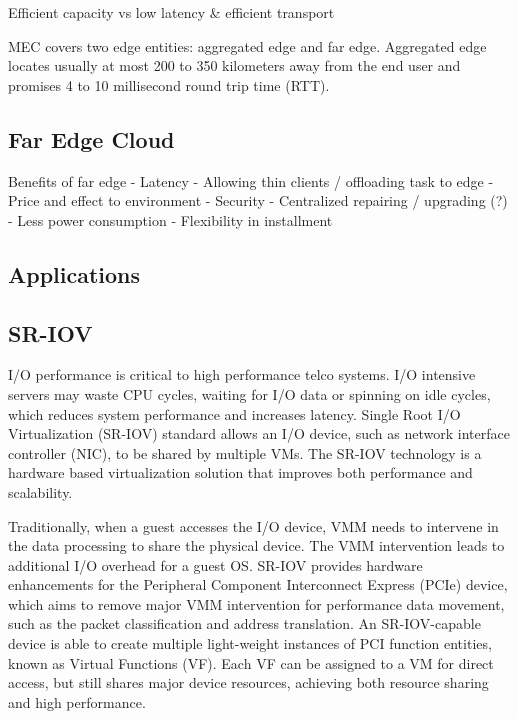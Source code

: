 Efficient capacity vs low latency \& efficient transport

MEC covers two edge entities: aggregated edge and far edge. Aggregated edge locates usually at most 200 to 350 kilometers away from the end user and promises 4 to 10 millisecond round trip time (RTT).

\subsection{Far Edge Cloud}

Benefits of far edge
    - Latency
    - Allowing thin clients / offloading task to edge
    - Price and effect to environment
    - Security
    - Centralized repairing / upgrading (?)
    - Less power consumption
    - Flexibility in installment
    



\subsection{Applications}


\subsection{SR-IOV}
\label{section:SR-IOV}

I/O performance is critical to high performance telco systems. I/O intensive servers may waste CPU cycles, waiting for I/O data or spinning on idle cycles, which reduces system performance and increases latency. Single Root I/O Virtualization (SR-IOV) standard allows an I/O device, such as network interface controller (NIC), to be shared by multiple VMs. The SR-IOV technology is a hardware based virtualization solution that improves both performance and scalability. \cite{Dong2012}

Traditionally, when a guest accesses the I/O device, VMM needs to intervene in the data processing to share the physical device. The VMM intervention leads to additional I/O overhead for a guest OS. SR-IOV provides hardware enhancements for the Peripheral Component Interconnect Express (PCIe) device, which aims to remove major VMM intervention for performance data movement, such as the packet classification and address translation. An SR-IOV-capable device is able to create multiple light-weight instances of PCI function entities, known as Virtual Functions (VF). Each VF can be assigned to a VM for direct access, but still shares major device resources, achieving both resource sharing and high performance. \cite{Dong2012}





